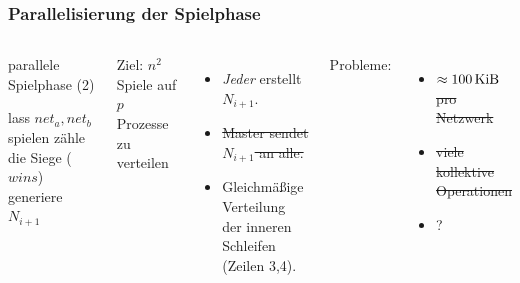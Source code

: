 \begin{frame}[t]
    \frametitle{Parallelisierung der Spielphase}

    \begin{columns}[t]
        \vspace{-0.7cm}
        \begin{algorithm}[H]
            \caption{parallele Spielphase (2)}
            \begin{algorithmic}[1]
                            \State lass $net_a, net_b$ spielen
                            \State zähle die Siege ($wins$)
                        \EndParDo
                    \EndParDo
                    \State {}
                    \State generiere $N_{i+1}$
                \EndFor
            \end{algorithmic}
        \end{algorithm}
        \hfill

        Ziel: $n^2$ Spiele auf $p$ Prozesse zu verteilen
        \begin{itemize}
            \item \emph{Jeder} erstellt $N_{i+1}$.
            \item \sout{Master sendet $N_{i+1}$ an alle.}
            \item Gleichmäßige Verteilung der inneren Schleifen (Zeilen 3,4).
        \end{itemize}
        Probleme:
        \begin{itemize}
            \item \sout{$\approx \SI{100}{\kibi\byte}$ pro Netzwerk}
            \item \sout{viele kollektive Operationen}
            \item ?
        \end{itemize}
    \end{columns}
\end{frame}

